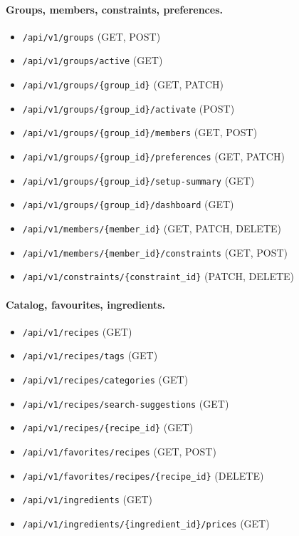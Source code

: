\paragraph{Groups, members, constraints, preferences.}
\begin{itemize}
\item \texttt{/api/v1/groups} (GET, POST)
\item \texttt{/api/v1/groups/active} (GET)
\item \texttt{/api/v1/groups/\{group\_id\}} (GET, PATCH)
\item \texttt{/api/v1/groups/\{group\_id\}/activate} (POST)
\item \texttt{/api/v1/groups/\{group\_id\}/members} (GET, POST)
\item \texttt{/api/v1/groups/\{group\_id\}/preferences} (GET, PATCH)
\item \texttt{/api/v1/groups/\{group\_id\}/setup-summary} (GET)
\item \texttt{/api/v1/groups/\{group\_id\}/dashboard} (GET)
\item \texttt{/api/v1/members/\{member\_id\}} (GET, PATCH, DELETE)
\item \texttt{/api/v1/members/\{member\_id\}/constraints} (GET, POST)
\item \texttt{/api/v1/constraints/\{constraint\_id\}} (PATCH, DELETE)
\end{itemize}

\paragraph{Catalog, favourites, ingredients.}
\begin{itemize}
\item \texttt{/api/v1/recipes} (GET)
\item \texttt{/api/v1/recipes/tags} (GET)
\item \texttt{/api/v1/recipes/categories} (GET)
\item \texttt{/api/v1/recipes/search-suggestions} (GET)
\item \texttt{/api/v1/recipes/\{recipe\_id\}} (GET)
\item \texttt{/api/v1/favorites/recipes} (GET, POST)
\item \texttt{/api/v1/favorites/recipes/\{recipe\_id\}} (DELETE)
\item \texttt{/api/v1/ingredients} (GET)
\item \texttt{/api/v1/ingredients/\{ingredient\_id\}/prices} (GET)
\end{itemize}

